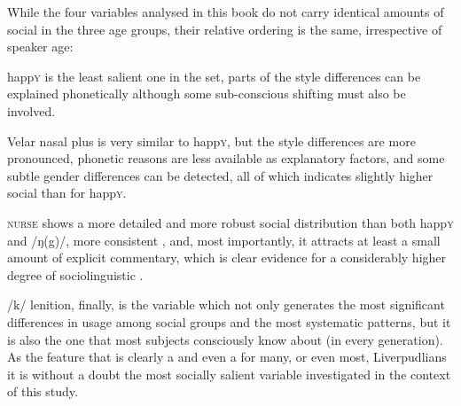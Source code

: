 While the four variables analysed in this book do not carry identical amounts of social  in the three age groups, their relative ordering is the same, irrespective of speaker age:
\begin{inparaenum}[(1)]
	\item happ\textsc{y} is the least salient one in the set, parts of the style differences can be explained phonetically although some sub-conscious shifting must also be involved.
	\item Velar nasal plus is very similar to happ\textsc{y}, but the style differences are more pronounced, phonetic reasons are less available as explanatory factors, and some subtle gender differences can be detected, all of which indicates slightly higher social  than for happ\textsc{y}.
	\item \textsc{nurse} shows a more detailed and more robust social distribution than both happ\textsc{y} and /ŋ(g)/, more consistent , and, most importantly, it attracts at least a small amount of explicit commentary, which is clear evidence for a considerably higher degree of sociolinguistic .
	\item /k/ lenition, finally, is the variable which not only generates the most significant differences in usage among social groups and the most systematic  patterns, but it is also the one that most subjects consciously know about (in every generation).
	As the feature that is clearly a  and even a  for many, or even most, Liverpudlians it is without a doubt the most socially salient variable investigated in the context of this study.
\end{inparaenum}